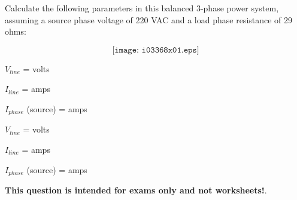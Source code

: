 

Calculate the following parameters in this balanced 3-phase power system, assuming a source phase voltage of 220 VAC and a load phase resistance of 29 ohms:

$$\texttt{[image: i03368x01.eps]}$$

$V_{line}$ = \underbar{\hskip 50pt} volts

\vskip 10pt

$I_{line}$ = \underbar{\hskip 50pt} amps

\vskip 10pt

$I_{phase}$ (source) = \underbar{\hskip 50pt} amps







$V_{line}$ =  volts

$I_{line}$ =  amps

$I_{phase}$ (source) =  amps







{\bf This question is intended for exams only and not worksheets!}.



